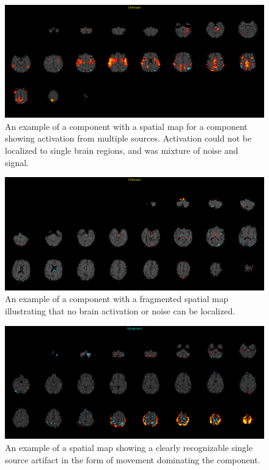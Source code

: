 \begin{figure}[H]                 
	\includegraphics[width=.85\textwidth]{figures/bMethods/Unknown_mix}  
	\caption{An example of a  component with a spatial map for a component showing activation from multiple sources. Activation could not be localized to single brain regions, and was mixture of noise and signal.}
	\label{fig:meth:Unknown_mix} 
\end{figure}

\begin{figure}[H]                 
	\includegraphics[width=.85\textwidth]{figures/bMethods/Frag}  
	\caption{An example of a component with a fragmented spatial map illustrating that no brain activation or noise can be localized.}
	\label{fig:meth:Frag} 
\end{figure}

\begin{figure}[H]                 
	\includegraphics[width=.85\textwidth]{figures/bMethods/Movement}  
	\caption{An example of a spatial map showing a clearly recognizable single source artifact in the form of movement dominating the component.}
	\label{fig:meth:Move} 
\end{figure}






 